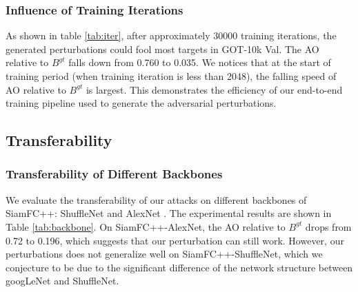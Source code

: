 \documentclass{article}
\begin{document}
\begin{table}[h]
\centering
{}
\caption{Contribution of each loss on GOT-10k\_Val.}
\end{table}

\subsubsection{Influence of Training Iterations}

As shown in table \ref{tab:iter}, after approximately 30000 training iterations, the generated perturbations could fool most targets in GOT-10k Val. The AO relative to $B^{gt}$ falls down from 0.760 to 0.035. We notices that at the start of training period (when training iteration is less than 2048), the falling speed of AO relative to $B^{gt}$ is largest. This demonstrates the efficiency of our end-to-end training pipeline used to generate the adversarial perturbations.

\subsection{Transferability}

\subsubsection{Transferability of Different Backbones}

We evaluate the transferability of our attacks on different backbones of SiamFC++: ShuffleNet \cite{ShuffleNet} and AlexNet \cite{AlexNet}.
The experimental results are shown in Table \ref{tab:backbone}. On SiamFC++-AlexNet, the AO relative to $B^{gt}$ drops from 0.72 to 0.196, which suggests that our perturbation can still work. However, our perturbations does not generalize well on SiamFC++-ShuffleNet, which we conjecture to be due to the significant difference of the network structure between googLeNet and ShuffleNet.
\end{document}
